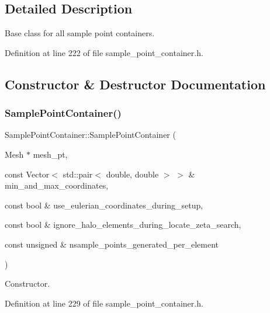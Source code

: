 \subsection{Detailed Description}
Base class for all sample point containers. 

Definition at line 222 of file sample\+\_\+point\+\_\+container.\+h.



\subsection{Constructor \& Destructor Documentation}
\mbox{\label{classSamplePointContainer_a68326e89f80f01690d8c2d03effb8508}} 
\subsubsection{\texorpdfstring{Sample\+Point\+Container()}{SamplePointContainer()}\hspace{0.1cm}{\footnotesize\ttfamily [1/3]}}
{\footnotesize\ttfamily Sample\+Point\+Container\+::\+Sample\+Point\+Container (\begin{DoxyParamCaption}\item[{Mesh $\ast$}]{mesh\+\_\+pt,  }\item[{const Vector$<$ std\+::pair$<$ double, double $>$ $>$ \&}]{min\+\_\+and\+\_\+max\+\_\+coordinates,  }\item[{const bool \&}]{use\+\_\+eulerian\+\_\+coordinates\+\_\+during\+\_\+setup,  }\item[{const bool \&}]{ignore\+\_\+halo\+\_\+elements\+\_\+during\+\_\+locate\+\_\+zeta\+\_\+search,  }\item[{const unsigned \&}]{nsample\+\_\+points\+\_\+generated\+\_\+per\+\_\+element }\end{DoxyParamCaption})\hspace{0.3cm}{\ttfamily [inline]}}



Constructor. 



Definition at line 229 of file sample\+\_\+point\+\_\+container.\+h.

\mbox{\label{classSamplePointContainer_a6801f78c9d6b55a69f7e60a372dc9bf2}} 

